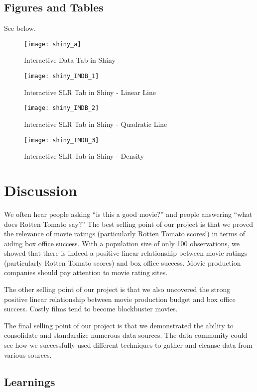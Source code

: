 \documentclass{article}
\begin{document}
\subsection{Figures and Tables}

See below.
\newpage

\begin{figure}[!htb]
  	\centering
		\texttt{[image: shiny\_a]}
  	\caption{Interactive Data Tab in Shiny}

  	\centering
		\texttt{[image: shiny\_IMDB\_1]}
  	\caption{Interactive SLR Tab in Shiny - Linear Line}
\end{figure}

\begin{figure}[!htb]
  	\centering
		\texttt{[image: shiny\_IMDB\_2]}
  	\caption{Interactive SLR Tab in Shiny - Quadratic Line}

  	\centering
		\texttt{[image: shiny\_IMDB\_3]}
  	\caption{Interactive SLR Tab in Shiny - Density}
\end{figure}

\section{Discussion}

We often hear people asking “is this a good movie?”  and people answering “what does Rotten Tomato say?”  The best selling point of our project is that we proved the relevance of movie ratings (particularly Rotten Tomato scores!) in terms of aiding box office success.  With a population size of only 100 observations, we showed that there is indeed a positive linear relationship between movie ratings (particularly Rotten Tomato scores) and box office success.  Movie production companies should pay attention to movie rating sites.

The other selling point of our project is that we also uncovered the strong positive linear relationship between movie production budget and box office success.  Costly films tend to become blockbuster movies. 

The final selling point of our project is that we demonstrated the ability to consolidate and standardize numerous data sources.  The data community could see how we successfully used different techniques to gather and cleanse data from various sources.

\subsection{Learnings}
\end{document}
